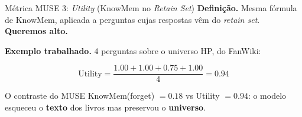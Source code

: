 \documentclass[aspectratio=169,xcolor=dvipsnames]{beamer}
\begin{document}
  \begin{frame}{Métrica MUSE 3: \textit{Utility} (KnowMem no \textit{Retain Set})}
    \textbf{Definição.} Mesma fórmula de KnowMem, aplicada a perguntas cujas respostas vêm do \textit{retain set}. \textbf{Queremos alto.}

    \vspace{0.3em}
    \textbf{Exemplo trabalhado.} 4 perguntas sobre o universo HP, do FanWiki:

    \centering

    \[
      \text{Utility} = \frac{1.00 + 1.00 + 0.75 + 1.00}{4} = \mathbf{0.94}
    \]

    \begin{block}{O contraste do MUSE}
      \footnotesize KnowMem(forget) $= 0.18$ vs Utility $= 0.94$: o modelo esqueceu o \textbf{texto} dos livros mas preservou o \textbf{universo}.
    \end{block}
  \end{frame}
\end{document}
